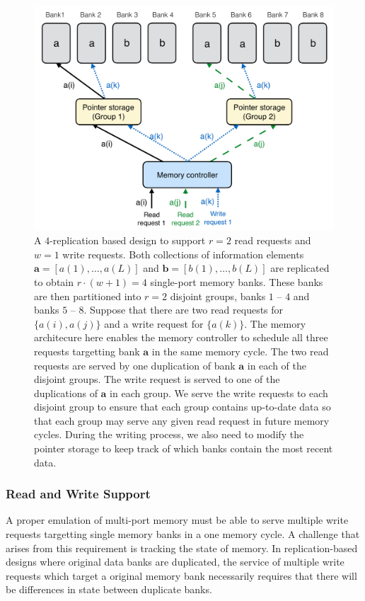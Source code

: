 \begin{figure}[t!]
\centering
\includegraphics[width=0.86\linewidth]{fig/rw-replication.pdf}
\caption{A $4$-replication based design to support $r = 2$ read requests and $w = 1$ write requests. Both collections of information elements $\mathbf{a} = [a(1),\ldots, a(L)]$ and $\mathbf{b} = [b(1),\ldots, b(L)]$ are replicated to obtain $r\cdot (w + 1) = 4$ single-port memory banks. These banks are then partitioned into $r = 2$ disjoint groups, banks $1$ -- $4$ and banks $5$ -- $8$. 
Suppose that there are two read requests for $\{a(i), a(j)\}$ and a write request for $\{a(k)\}$. The memory architecure here enables the memory controller to schedule all three requests targetting bank $\mathbf{a}$ in the same memory cycle. The two read requests are served by one duplication of bank $\mathbf{a}$ in each of the disjoint groups. The write request is served to one of the duplications of $\mathbf{a}$ in each group. We serve the write requests to each disjoint group to ensure that each group contains up-to-date data so that each group may serve any given read request in future memory cycles. During the writing process, we also need to modify the pointer storage to keep track of which banks contain the most recent data.}
\label{fig:rw_replication}
\end{figure}
\subsubsection{Read and Write Support}
\label{sec:rw}
A proper emulation of multi-port memory must be able to serve multiple write requests targetting single memory banks in a one memory cycle. A challenge that arises from this requirement is tracking the state of memory. In replication-based designs where original data banks are duplicated, the service of multiple write requests which target a original memory bank necessarily requires that there will be differences in state between duplicate banks.

